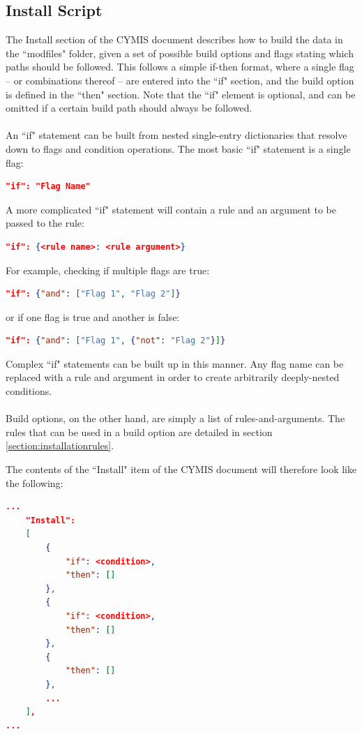\documentclass{article}
\begin{document}
\subsection{Install Script}\label{section:installscript}
The Install section of the CYMIS document describes how to build the data in the ``modfiles" folder, given a set of possible build options and flags stating which paths should be followed. This follows a simple if-then format, where a single flag -- or combinations thereof -- are entered into the ``if" section, and the build option is defined in the ``then" section. Note that the ``if" element is optional, and can be omitted if a certain build path should always be followed.\\\\
An ``if" statement can be built from nested single-entry dictionaries that resolve down to flags and condition operations. The most basic ``if" statement is a single flag:
\begin{lstlisting}[language=json,firstnumber=1]
"if": "Flag Name"
\end{lstlisting}
A more complicated ``if" statement will contain a rule and an argument to be passed to the rule:
\begin{lstlisting}[language=json,firstnumber=1]
"if": {<rule name>: <rule argument>}
\end{lstlisting}
For example, checking if multiple flags are true:
\begin{lstlisting}[language=json,firstnumber=1]
"if": {"and": ["Flag 1", "Flag 2"]}
\end{lstlisting}
or if one flag is true and another is false:
\begin{lstlisting}[language=json,firstnumber=1]
"if": {"and": ["Flag 1", {"not": "Flag 2"}]}
\end{lstlisting}
Complex ``if" statements can be built up in this manner. Any flag name can be replaced with a rule and argument in order to create arbitrarily deeply-nested conditions.\\\\
Build options, on the other hand, are simply a list of rules-and-arguments. The rules that can be used in a build option are detailed in section \ref{section:installationrules}.

\noindent The contents of the ``Install" item of the CYMIS document will therefore look like the following:
\begin{lstlisting}[language=json,firstnumber=1]
...
    "Install": 
    [
        {
            "if": <condition>,
            "then": []   
        },
        {
            "if": <condition>,
            "then": []   
        },
        {
            "then": []   
        },
        ...
    ],
...
\end{lstlisting}
\newpage
\end{document}
